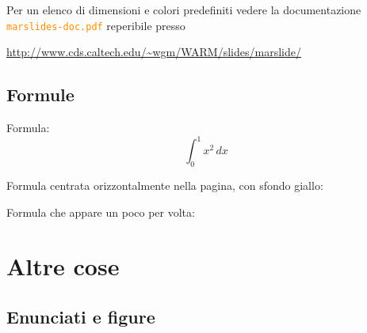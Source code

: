 \documentclass[italian,landscape]{report}
\begin{document}
\pause

\bigskip

\begin{thirdheadlineitemize}

\item Per un elenco di dimensioni e colori predefiniti vedere la documentazione \textcolor{darkorange}{\texttt{marslides-doc.pdf}} reperibile presso

\end{thirdheadlineitemize}

\begin{center}
\url{http://www.cds.caltech.edu/~wgm/WARM/slides/marslide/}
\end{center}

\section{Formule}


\begin{secondheadlineitemize}

\item Formula:
$$\int_0^1x^2\,dx$$

\pause

\item Formula centrata orizzontalmente nella pagina, con sfondo giallo:

\pause

\item Formula che appare un poco per volta:

\pause


\end{secondheadlineitemize}


\chapter{Altre cose}


\section{Enunciati e figure}
\end{document}
